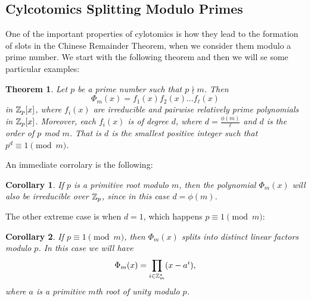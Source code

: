 \documentclass[12pt]{article}
\theoremstyle{plain}
\newtheorem{corollary}{Corollary}
\newtheorem{theorem}{Theorem}
\theoremstyle{definition}
\theoremstyle{remark}
\begin{document}
\subsection{Cylcotomics Splitting Modulo Primes}
One of the important properties of cylotomics is how they lead to the formation of slots in the Chinese Remainder Theorem, when we consider them modulo a prime number. We start with the following theorem and then we will se some particular examples:
\begin{theorem}
Let $p$ be a prime number such that $p\nmid m$. Then
$$\Phi_m(x) = f_1(x)f_2(x)\dots f_{\ell}(x)$$
in $\mathbb{Z}_p[x]$, where $f_i(x)$ are irreducible and pairwise relatively prime polynomials in $\mathbb{Z}_p[x]$. Moreover, each $f_i(x)$ is of degree $d$, where $d=\frac{\phi(m)}{\ell}$ and $d$ is the order of $p$ mod $m$. That is $d$ is the smallest positive integer such that $p^d\equiv 1\pmod{m}$.
\end{theorem}
An immediate corrolary is the following:
\begin{corollary}
 If $p$ is a primitive root modulo $m$, then the polynomial $\Phi_m(x)$ will also be irreducible over $\mathbb{Z}_p$, since in this case $d=\phi(m)$.
\end{corollary}
The other extreme case is when $d=1$, which happens $p\equiv 1 \pmod{m}$:
\begin{corollary}
If $p \equiv 1 \pmod{m}$, then $\Phi_{m}(x)$ splits into distinct linear factors modulo $p$. In this case we will have $$\Phi_m(x) = \prod_{i\in \mathbb{Z}_m^*}(x-a^i),$$
where $a$ is a primitive $m$th root of unity modulo $p$.
\end{corollary}
\end{document}
